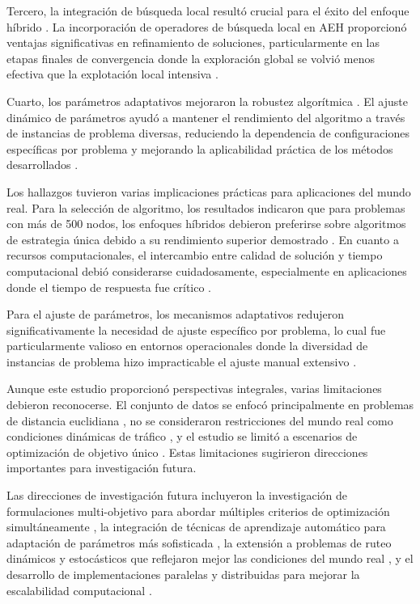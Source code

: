\documentclass[12pt,a4paper]{article}
\begin{document}
Tercero, la integración de búsqueda local resultó crucial para el éxito del enfoque híbrido \cite{moscato1989evolution}. La incorporación de operadores de búsqueda local en AEH proporcionó ventajas significativas en refinamiento de soluciones, particularmente en las etapas finales de convergencia donde la exploración global se volvió menos efectiva que la explotación local intensiva \cite{lin1973effective}.

Cuarto, los parámetros adaptativos mejoraron la robustez algorítmica \cite{meyer2007parameter}. El ajuste dinámico de parámetros ayudó a mantener el rendimiento del algoritmo a través de instancias de problema diversas, reduciendo la dependencia de configuraciones específicas por problema y mejorando la aplicabilidad práctica de los métodos desarrollados \cite{eiben2007parameter}.

Los hallazgos tuvieron varias implicaciones prácticas para aplicaciones del mundo real. Para la selección de algoritmo, los resultados indicaron que para problemas con más de 500 nodos, los enfoques híbridos debieron preferirse sobre algoritmos de estrategia única debido a su rendimiento superior demostrado \cite{ombuki2006multi}. En cuanto a recursos computacionales, el intercambio entre calidad de solución y tiempo computacional debió considerarse cuidadosamente, especialmente en aplicaciones donde el tiempo de respuesta fue crítico \cite{gendreau2010metaheuristics}.

Para el ajuste de parámetros, los mecanismos adaptativos redujeron significativamente la necesidad de ajuste específico por problema, lo cual fue particularmente valioso en entornos operacionales donde la diversidad de instancias de problema hizo impracticable el ajuste manual extensivo \cite{lobo2007parameter}.

Aunque este estudio proporcionó perspectivas integrales, varias limitaciones debieron reconocerse. El conjunto de datos se enfocó principalmente en problemas de distancia euclidiana \cite{christofides1979combinatorial}, no se consideraron restricciones del mundo real como condiciones dinámicas de tráfico \cite{pillac2013dynamic}, y el estudio se limitó a escenarios de optimización de objetivo único \cite{jozefowiez2008multi}. Estas limitaciones sugirieron direcciones importantes para investigación futura.

Las direcciones de investigación futura incluyeron la investigación de formulaciones multi-objetivo para abordar múltiples criterios de optimización simultáneamente \cite{jozefowiez2008multi}, la integración de técnicas de aprendizaje automático para adaptación de parámetros más sofisticada \cite{hutter2011automated}, la extensión a problemas de ruteo dinámicos y estocásticos que reflejaron mejor las condiciones del mundo real \cite{pillac2013dynamic}, y el desarrollo de implementaciones paralelas y distribuidas para mejorar la escalabilidad computacional \cite{alba2013parallel}.
\end{document}

